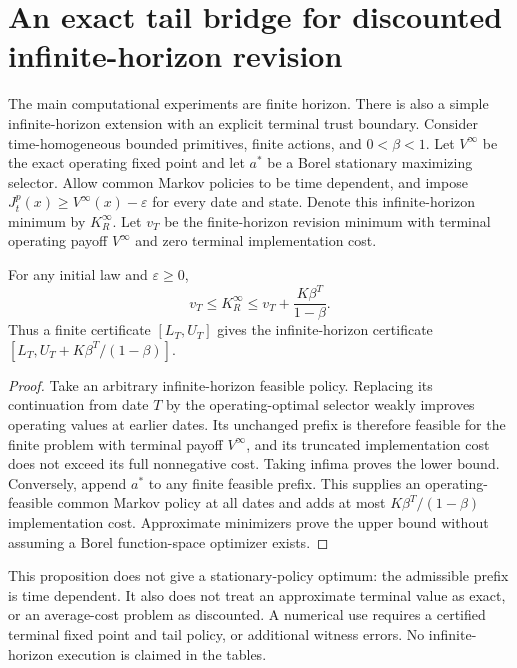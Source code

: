 \section{An exact tail bridge for discounted infinite-horizon revision}
The main computational experiments are finite horizon. There is also a simple infinite-horizon extension with an explicit terminal trust boundary. Consider time-homogeneous bounded primitives, finite actions, and $0<\beta<1$. Let $V^\infty$ be the exact operating fixed point and let $a^*$ be a Borel stationary maximizing selector. Allow common Markov policies to be time dependent, and impose $J_t^p(x)\geq V^\infty(x)-\varepsilon$ for every date and state. Denote this infinite-horizon minimum by $K_R^\infty$. Let $v_T$ be the finite-horizon revision minimum with terminal operating payoff $V^\infty$ and zero terminal implementation cost.
\begin{proposition}
For any initial law and $\varepsilon\geq0$,
\[
 v_T\leq K_R^\infty\leq v_T+\frac{K\beta^T}{1-\beta}.
\]
Thus a finite certificate $[L_T,U_T]$ gives the infinite-horizon certificate $[L_T,U_T+K\beta^T/(1-\beta)]$.
\end{proposition}
\begin{proof}
Take an arbitrary infinite-horizon feasible policy. Replacing its continuation from date $T$ by the operating-optimal selector weakly improves operating values at earlier dates. Its unchanged prefix is therefore feasible for the finite problem with terminal payoff $V^\infty$, and its truncated implementation cost does not exceed its full nonnegative cost. Taking infima proves the lower bound. Conversely, append $a^*$ to any finite feasible prefix. This supplies an operating-feasible common Markov policy at all dates and adds at most $K\beta^T/(1-\beta)$ implementation cost. Approximate minimizers prove the upper bound without assuming a Borel function-space optimizer exists.
\end{proof}
This proposition does not give a stationary-policy optimum: the admissible prefix is time dependent. It also does not treat an approximate terminal value as exact, or an average-cost problem as discounted. A numerical use requires a certified terminal fixed point and tail policy, or additional witness errors. No infinite-horizon execution is claimed in the tables.

